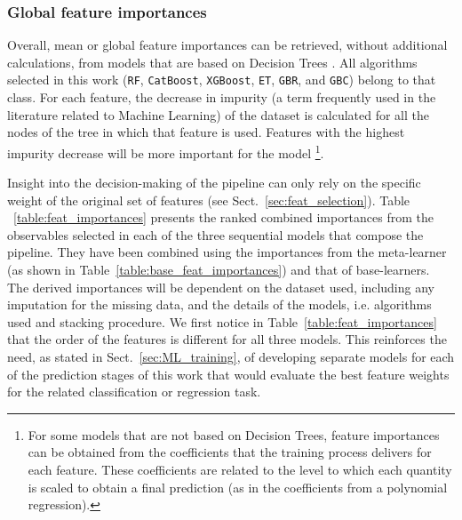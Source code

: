 \documentclass{aa}
\begin{document}
\subsubsection{Global feature importances}\label{sec:feat_importances}

Overall, mean or global feature importances can be retrieved, without additional calculations, from models that are based on Decision Trees \citep[e.g. Random Forests and Boosting models,][]{Breiman2001, breiman2002manual}. All algorithms selected in this work (\verb|RF|, \verb|CatBoost|, \verb|XGBoost|, \verb|ET|, \verb|GBR|, and \verb|GBC|) belong to that class. For each feature, the decrease in impurity (a term frequently used in the literature related to Machine Learning) of the dataset is calculated for all the nodes of the tree in which that feature is used. Features with the highest impurity decrease will be more important for the model \citep{NIPS2013_e3796ae8}\footnote{For some models that are not based on Decision Trees, feature importances can be obtained from the coefficients that the training process delivers for each feature. These coefficients are related to the level to which each quantity is scaled to obtain a final prediction (as in the coefficients from a polynomial regression).}.

Insight into the decision-making of the pipeline can only rely on the specific weight of the original set of features (see Sect.~\ref{sec:feat_selection}). Table ~\ref{table:feat_importances} presents the ranked combined importances from the observables selected in each of the three sequential models that compose the pipeline. They have been combined using the importances from the meta-learner (as shown in Table~\ref{table:base_feat_importances}) and that of base-learners. The derived importances will be dependent on the dataset used, including any imputation for the missing data, and the details of the models, i.e. algorithms used and stacking procedure. 
We first notice in Table~\ref{table:feat_importances} that the order of the features is different for all three models. This reinforces the need, as stated in Sect.~\ref{sec:ML_training}, of developing separate models for each of the prediction stages of this work that would evaluate the best feature weights for the related classification or regression task. 
\end{document}
